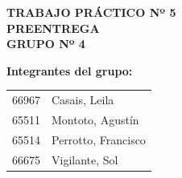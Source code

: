 \begin{center}
    
    {\large \textbf{TRABAJO PRÁCTICO Nº 5}}\\[0.5cm]
    
    {\Large \textbf{PREENTREGA }}\\[1cm]
    
    {\normalsize \textbf{GRUPO Nº 4}}\\[0.5cm]

\end{center}

\vspace{0.5cm}

\textbf{Integrantes del grupo:}

\vspace{0.3cm}

\begin{tabular}{p{5cm} p{8cm}}
66967 & Casais, Leila \\
65511 & Montoto, Agustín \\
65514 & Perrotto, Francisco \\
66675 & Vigilante, Sol \\
\end{tabular}

\vspace{0.8cm}

\vspace{1cm}

\newpage